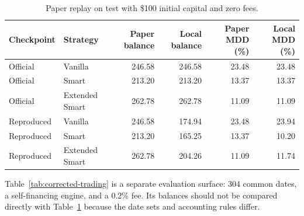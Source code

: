 \documentclass[13pt,a4paper,oneside]{report}
\begin{document}
\begin{table}[htbp]
\centering
\caption{Paper replay on test with \$100 initial capital and zero fees.}
\label{tab:paper-replay}
{\small
\begin{tabularx}{\linewidth}{@{}llrrrr@{}}
\toprule
\textbf{Checkpoint} & \textbf{Strategy} & \textbf{Paper balance} & \textbf{Local balance} & \textbf{Paper MDD (\%)} & \textbf{Local MDD (\%)} \\
\midrule
Official & Vanilla & \num{246.58} & \num{246.58} & \num{23.48} & \num{23.48} \\
Official & Smart & \num{213.20} & \num{213.20} & \num{13.37} & \num{13.37} \\
Official & Extended Smart & \num{262.78} & \num{262.78} & \num{11.09} & \num{11.09} \\
\midrule
Reproduced & Vanilla & \num{246.58} & \num{174.94} & \num{23.48} & \num{23.94} \\
Reproduced & Smart & \num{213.20} & \num{165.25} & \num{13.37} & \num{10.20} \\
Reproduced & Extended Smart & \num{262.78} & \num{204.26} & \num{11.09} & \num{11.74} \\
\bottomrule
\end{tabularx}}
\end{table}

Table~\ref{tab:corrected-trading} is a separate evaluation surface: 304 common dates, a
self-financing engine, and a 0.2\% fee. Its balances should not be compared directly with
Table~\ref{tab:paper-replay} because the date sets and accounting rules differ.
\end{document}
